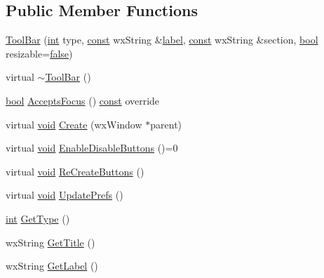 \subsection*{Public Member Functions}
\begin{DoxyCompactItemize}
\item 
\hyperlink{class_tool_bar_a7229107e8facac2e33be869da2417d02}{Tool\+Bar} (\hyperlink{xmltok_8h_a5a0d4a5641ce434f1d23533f2b2e6653}{int} type, \hyperlink{getopt1_8c_a2c212835823e3c54a8ab6d95c652660e}{const} wx\+String \&\hyperlink{_tags_8cpp_a0a3345b0d4574d7adffe113dacd8ccec}{label}, \hyperlink{getopt1_8c_a2c212835823e3c54a8ab6d95c652660e}{const} wx\+String \&section, \hyperlink{mac_2config_2i386_2lib-src_2libsoxr_2soxr-config_8h_abb452686968e48b67397da5f97445f5b}{bool} resizable=\hyperlink{mac_2config_2i386_2lib-src_2libsoxr_2soxr-config_8h_a65e9886d74aaee76545e83dd09011727}{false})
\item 
virtual \hyperlink{class_tool_bar_a0267f4c1dabd6bbd7a2090b998809086}{$\sim$\+Tool\+Bar} ()
\item 
\hyperlink{mac_2config_2i386_2lib-src_2libsoxr_2soxr-config_8h_abb452686968e48b67397da5f97445f5b}{bool} \hyperlink{class_tool_bar_af9ce933cfd2cf836bb32532ccf401d38}{Accepts\+Focus} () \hyperlink{getopt1_8c_a2c212835823e3c54a8ab6d95c652660e}{const}  override
\item 
virtual \hyperlink{sound_8c_ae35f5844602719cf66324f4de2a658b3}{void} \hyperlink{class_tool_bar_adb34708a835ad790bff1a0c5de56aa49}{Create} (wx\+Window $\ast$parent)
\item 
virtual \hyperlink{sound_8c_ae35f5844602719cf66324f4de2a658b3}{void} \hyperlink{class_tool_bar_a22b13ae4b2940faa266cf4f6923f1f9c}{Enable\+Disable\+Buttons} ()=0
\item 
virtual \hyperlink{sound_8c_ae35f5844602719cf66324f4de2a658b3}{void} \hyperlink{class_tool_bar_a46b35846244b1687caaaa4ad86439f16}{Re\+Create\+Buttons} ()
\item 
virtual \hyperlink{sound_8c_ae35f5844602719cf66324f4de2a658b3}{void} \hyperlink{class_tool_bar_aa99fb02eb388e5f1c3bc59443bfd4d00}{Update\+Prefs} ()
\item 
\hyperlink{xmltok_8h_a5a0d4a5641ce434f1d23533f2b2e6653}{int} \hyperlink{class_tool_bar_ad8e324932d4c14209e079c259e04437c}{Get\+Type} ()
\item 
wx\+String \hyperlink{class_tool_bar_a48c60f2ca1504f0fd3b926e0f03fee18}{Get\+Title} ()
\item 
wx\+String \hyperlink{class_tool_bar_ab0090c0540455f436df2943e02b7c477}{Get\+Label} ()

\end{DoxyCompactItemize}
